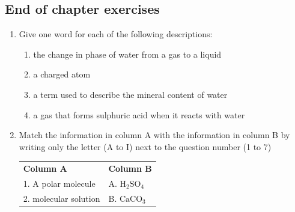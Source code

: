             \subsection{ End of chapter exercises}
            \nopagebreak
            \label{m38719*id342869}\begin{enumerate}[noitemsep, label=\textbf{\arabic*}. ] 
            \label{m38719*uid107}\item Give one word for each of the following descriptions:
\label{m38719*id342885}\begin{enumerate}[noitemsep, label=\textbf{\alph*}. ] 
            \label{m38719*uid108}\item the change in phase of water from a gas to a liquid
\label{m38719*uid109}\item a charged atom
\label{m38719*uid110}\item a term used to describe the mineral content of water
\label{m38719*uid111}\item a gas that forms sulphuric acid when it reacts with water
\end{enumerate}
\label{m38719*uid112}\item Match the information in column A with the information in column B by writing only the letter (A to I) next to the question number (1 to 7)
          \begin{table}[H]
        \begin{center}
      \label{m38719*id342952}
    \noindent
      \tablelasttail{}
      \begin{xtabular}[t]{|l|l|}\hline
        \textbf{Column A} &
        \textbf{Column B}%
     \tabularnewline{}
        1. A polar molecule &
        A. ${\mathrm{H}}_{2}{\mathrm{SO}}_{4}$%
     \tabularnewline{}
        2. molecular solution &
        B. ${\mathrm{CaCO}}_{3}$%
     \tabularnewline{}

\end{xtabular}
\end{center}
\end{table}
\end{enumerate}
